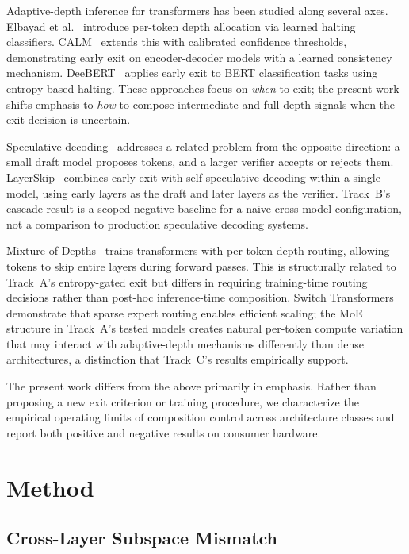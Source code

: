 \documentclass[11pt]{article}
\begin{document}
Adaptive-depth inference for transformers has been studied along several axes. Elbayad et al.~\cite{elbayad2020depthadaptive} introduce per-token depth allocation via learned halting classifiers. CALM~\cite{schuster2022calm} extends this with calibrated confidence thresholds, demonstrating early exit on encoder-decoder models with a learned consistency mechanism. DeeBERT~\cite{xin2020deebert} applies early exit to BERT classification tasks using entropy-based halting. These approaches focus on \emph{when} to exit; the present work shifts emphasis to \emph{how} to compose intermediate and full-depth signals when the exit decision is uncertain.

Speculative decoding~\cite{leviathan2023speculative, chen2023speculative} addresses a related problem from the opposite direction: a small draft model proposes tokens, and a larger verifier accepts or rejects them. LayerSkip~\cite{elhoushi2024layerskip} combines early exit with self-speculative decoding within a single model, using early layers as the draft and later layers as the verifier. Track~B's cascade result is a scoped negative baseline for a naive cross-model configuration, not a comparison to production speculative decoding systems.

Mixture-of-Depths~\cite{raposo2024mod} trains transformers with per-token depth routing, allowing tokens to skip entire layers during forward passes. This is structurally related to Track~A's entropy-gated exit but differs in requiring training-time routing decisions rather than post-hoc inference-time composition. Switch Transformers~\cite{fedus2022switch} demonstrate that sparse expert routing enables efficient scaling; the MoE structure in Track~A's tested models creates natural per-token compute variation that may interact with adaptive-depth mechanisms differently than dense architectures, a distinction that Track~C's results empirically support.

The present work differs from the above primarily in emphasis. Rather than proposing a new exit criterion or training procedure, we characterize the empirical operating limits of composition control across architecture classes and report both positive and negative results on consumer hardware.

\section{Method}

\subsection{Cross-Layer Subspace Mismatch}
\end{document}
